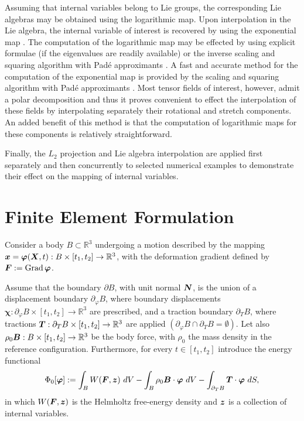 \documentclass[12pt]{article}
\newcommand{\mbs}[1]{\boldsymbol{#1}}
\newcommand{\mbb}[1]{\mathbb{#1}}
\def\bvarphi{{\mbs{\varphi}}}
\def\bchi{{\mbs{\chi}}}
\DeclareMathOperator{\Grad}{Grad}
\begin{document}
Assuming that internal variables belong to Lie groups, the corresponding Lie
algebras may be obtained using the logarithmic map. Upon interpolation in the
Lie algebra, the internal variable of interest is recovered by using the
exponential map \citep{Marsden.Ratiu:1999, Sepanski:2007,
Kosmann-Schwarzbach:2009,
  Gallier:2011}. The computation of the logarithmic map may be
effected by using explicit formulae (if the eigenvalues are readily available)
\citep{Jog:2008} or the inverse scaling and squaring algorithm with Pad\'e
approximants \citep{Cheng.etal:2001,
  Davies.Higham:2003}.  A fast and accurate method for the computation
of the exponential map is provided by the scaling and squaring algorithm with
Pad\'e approximants \citep{Higham:2001,Higham:2005}. Most tensor fields of
interest, however, admit a polar decomposition and thus it proves convenient to
effect the interpolation of these fields by interpolating separately their
rotational and stretch components. An added benefit of this method is that the
computation of logarithmic maps for these components is relatively
straightforward.

Finally, the $L_2$ projection and Lie algebra interpolation are applied first
separately and then concurrently to selected numerical examples to demonstrate
their effect on the mapping of internal variables.


\section{Finite Element Formulation}
\label{sec:FE-formulation}

Consider a body $B\subset\mbb{R}^3$ undergoing a motion described by
the mapping $\bx = \bvarphi(\bX, t): B\times[t_1, t_2]\rightarrow
\mbb{R}^3$, with the deformation gradient defined by $\bF := \Grad
\bvarphi$.

Assume that the boundary $\partial B$, with unit normal $\bN$, is the
union of a displacement boundary $\partial_{\varphi} B$, where
boundary displacements $\bchi : \partial_{\varphi} B\times[t_1,
t_2]\rightarrow \mbb{R}^3$ are prescribed, and a traction boundary
$\partial_T B$, where tractions $\bT: \partial_T B \times[t_1,
t_2]\rightarrow \mbb{R}^3$ are applied $(\partial_{\varphi} B \cap
\partial_T B = \emptyset)$. Let also $\rho_0 \bB: B \times [t_1,
t_2]\rightarrow \mbb{R}^3$ be the body force, with $\rho_0$ the mass
density in the reference configuration.  Furthermore, for every $t \in
[t_1, t_2]$ introduce the energy functional
\begin{equation}\label{eq:energy}
  \Phi_0[ \bvarphi ] :=
  \int_B W(\bF, \bz) \ dV
  -
  \int_B \rho_0 \bB \cdot \bvarphi \ dV
  -
  \int_{\partial_T B} \bT \cdot \bvarphi \ dS,
\end{equation}
in which $W(\bF, \bz)$ is the Helmholtz free-energy density and $\bz$
is a collection of internal variables.
\end{document}
